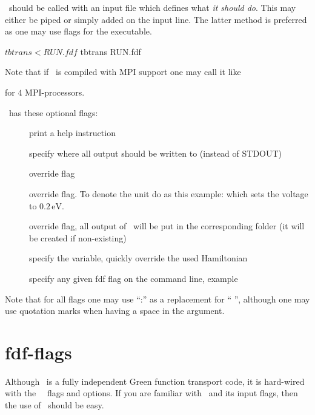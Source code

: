 \tbtrans\ should be called with an input file which defines what
\emph{it should do}. This may either be piped or simply added on the
input line. The latter method is preferred as one may use flags for
the executable.
\begin{shellexample}
  $ tbtrans < RUN.fdf
  $ tbtrans RUN.fdf
\end{shellexample}
Note that if \tbtrans\ is compiled with MPI support one may call it
like 
for $4$ MPI-processors.

\tbtrans\ has these optional flags:
\begin{description}
  \item[] print a help instruction

  \item[] specify where all output should be written to
  (instead of STDOUT)
  
  \item[] override  flag

  \item[] override  flag. To denote the
  unit do as this example:  which sets the voltage to
  $0.2\,$.

  \item[] override  flag, all output
  of \tbtrans\ will be put in the corresponding folder (it will be
  created if non-existing)

  \item[] specify the  variable, quickly
  override the used Hamiltonian

  \item[] specify any given fdf flag on the command line,
  example 

\end{description}
Note that for all flags one may use ``:'' as a replacement for `` '',
although one may use quotation marks when having a space in the argument.



\section{fdf-flags}


Although \tbtrans\ is a fully independent Green function transport
code, it is hard-wired with the \tsiesta\ \fdflib\ flags and
options. If you are familiar with \tsiesta\ and its input flags, then
the use of \tbtrans\ should be easy.

